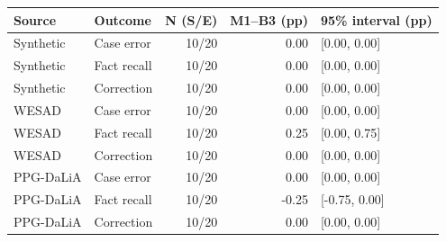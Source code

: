 \begin{tabular}{llrrl}
\toprule
Source & Outcome & N (S/E) & M1--B3 (pp) & 95\% interval (pp) \\
\midrule
Synthetic & Case error & 10/20 & 0.00 & [0.00, 0.00] \\
Synthetic & Fact recall & 10/20 & 0.00 & [0.00, 0.00] \\
Synthetic & Correction & 10/20 & 0.00 & [0.00, 0.00] \\
WESAD & Case error & 10/20 & 0.00 & [0.00, 0.00] \\
WESAD & Fact recall & 10/20 & 0.25 & [0.00, 0.75] \\
WESAD & Correction & 10/20 & 0.00 & [0.00, 0.00] \\
PPG-DaLiA & Case error & 10/20 & 0.00 & [0.00, 0.00] \\
PPG-DaLiA & Fact recall & 10/20 & -0.25 & [-0.75, 0.00] \\
PPG-DaLiA & Correction & 10/20 & 0.00 & [0.00, 0.00] \\
\bottomrule
\end{tabular}
